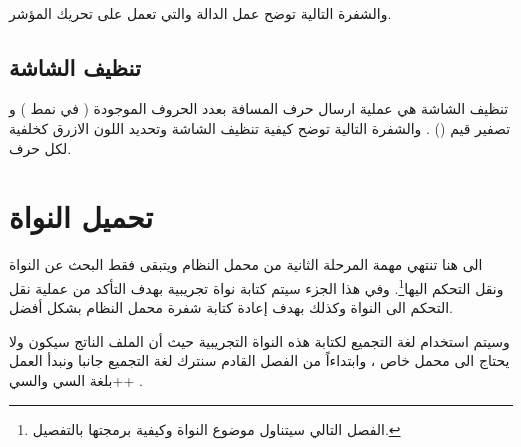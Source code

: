 \documentclass[document.tex]{subfiles}
\begin{document}
\begin{english}
\\
\end{english}

والشفرة التالية توضح عمل الدالة  والتي تعمل على تحريك المؤشر.

\begin{english}
\lstset{numberstyle=\tiny,numbersep=5pt,tabsize=2,extendedchars=true,breaklines=true,frame=b,showspaces=false, showtabs=false,xleftmargin=10pt,framexleftmargin=10pt,framexrightmargin=5pt,framexbottommargin=4pt,showstringspaces=false,language=[x86masm]Assembler}


\end{english}

\subsection{تنظيف الشاشة }
تنظيف الشاشة هي عملية ارسال حرف المسافة بعدد الحروف الموجودة ( في نمط ) و تصفير قيم () . والشفرة التالية توضح كيفية تنظيف الشاشة وتحديد اللون الازرق كخلفية لكل حرف.

\begin{english}
\lstset{numberstyle=\tiny,numbersep=5pt,tabsize=2,extendedchars=true,breaklines=true,frame=b,showspaces=false, showtabs=false,xleftmargin=10pt,framexleftmargin=10pt,framexrightmargin=5pt,framexbottommargin=4pt,showstringspaces=false,language=[x86masm]Assembler}


\end{english}

\section{تحميل النواة}
الى هنا تنتهي مهمة المرحلة الثانية من محمل النظام  ويتبقى فقط البحث عن النواة ونقل التحكم اليها\footnote{الفصل التالي سيتناول موضوع النواة وكيفية برمجتها بالتفصيل.}. وفي هذا الجزء سيتم كتابة نواة تجريبية بهدف التأكد من عملية نقل التحكم الى النواة وكذلك بهدف إعادة كتابة شفرة محمل النظام بشكل أفضل.

وسيتم استخدام لغة التجميع لكتابة هذه النواة التجريبية حيث أن الملف الناتج سيكون  ولا يحتاج الى محمل خاص ، وابتداءاً من الفصل القادم سنترك لغة التجميع جانبا ونبدأ العمل بلغة السي والسي++ .
\end{document}
